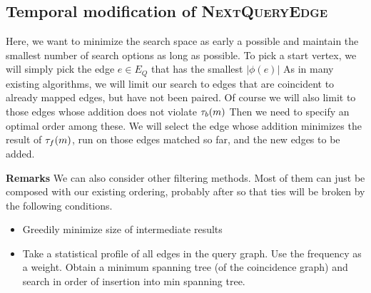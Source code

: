 \subsection{Temporal modification of \textsc{NextQueryEdge}}

Here, we want to minimize the search space as early a possible and maintain the
smallest number of search options as long as possible. To pick a start vertex,
we will simply pick the edge $e \in E_Q$ that has the smallest $|\phi(e)|$ As in
many existing algorithms, \cite{2004-PAMI-VF2, 2009-EDBT-GADDI,
  2008-SIGMOD-GraphQL} we will limit our search to edges that are coincident to
already mapped edges, but have not been paired. Of course we will also limit to
those edges whose addition does not violate $\tau_b(m)$ Then we need to
specify an optimal order among these.  We will select the edge whose addition
minimizes the result of $\tau_f(m)$, run on those edges matched so far, and
the new edges to be added.

\textbf{Remarks}
We can also consider other filtering methods.  Most of them can just be composed
with our existing ordering, probably after so that ties will be broken by the
following conditions.
\begin{itemize}
  \item Greedily minimize size of intermediate results \cite{2008-SIGMOD-GraphQL} 
  \item Take a statistical profile of all edges in the query graph. Use the
    frequency as a weight. Obtain a minimum spanning tree (of the coincidence
    graph) and search in order of insertion into min spanning
    tree. \cite{2008-VLDB-QuickSI}
\end{itemize}

